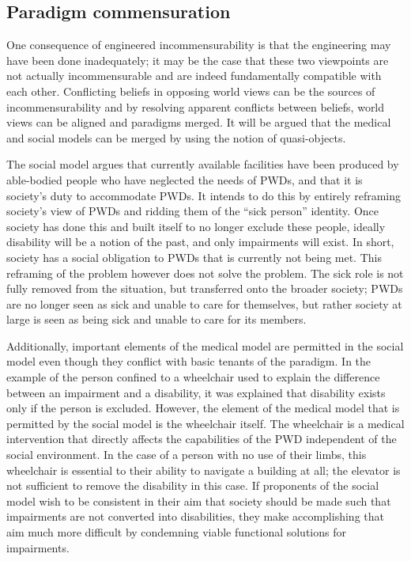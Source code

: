\documentclass[a4paper]{article}
\begin{document}
\subsection{Paradigm commensuration}

One consequence of engineered incommensurability is that the engineering may
have been done inadequately; it may be the case that these two viewpoints are
not actually incommensurable and are indeed fundamentally compatible with each
other. Conflicting beliefs in opposing world views can be the sources of
incommensurability and by resolving apparent conflicts between beliefs, world
views can be aligned and paradigms merged. It will be argued that the medical
and social models can be merged by using the notion of quasi-objects.

The social model argues that currently available facilities have been produced
by able-bodied people who have neglected the needs of PWDs, and that it is
society's duty to accommodate PWDs. It intends to do this by entirely
reframing society's view of PWDs and ridding them of the ``sick person''
identity. Once society has done this and built itself to no longer exclude
these people, ideally disability will be a notion of the past, and only
impairments will exist. In short, society has a social obligation to PWDs that
is currently not being met. This reframing of the problem however does not
solve the problem. The sick role is not fully removed from the situation, but
transferred onto the broader society; PWDs are no longer seen as sick and
unable to care for themselves, but rather society at large is seen as being
sick and unable to care for its members.

Additionally, important elements of the medical model are permitted in the
social model even though they conflict with basic tenants of the paradigm. In
the example of the person confined to a wheelchair used to explain the
difference between an impairment and a disability, it was explained that
disability exists only if the person is excluded. However, the element of the
medical model that is permitted by the social model is the wheelchair itself.
The wheelchair is a medical intervention that directly affects the
capabilities of the PWD independent of the social environment. In the case of
a person with no use of their limbs, this wheelchair is essential to their
ability to navigate a building at all; the elevator is not sufficient to
remove the disability in this case. If proponents of the social model wish to
be consistent in their aim that society should be made such that impairments
are not converted into disabilities, they make accomplishing that aim much
more difficult by condemning viable functional solutions for impairments.
\end{document}
